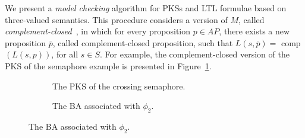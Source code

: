 %
%


We present a \emph{model checking} algorithm for PKSs and LTL formulae based on three-valued semantics. 
This procedure considers a version of $M$, called \emph{complement-closed}~\cite{bruns2000model}, in which for every proposition $p \in AP$, there exists a new proposition $\overline{p}$, called complement-closed proposition, such that $L(s,\overline{p})=$ comp$(L(s,p))$, for all $s \in S$.
For example, the complement-closed version of the PKS of the semaphore example is presented in Figure~\ref{fig:model}.

\begin{figure}[t]
\begin{minipage}[b]{.5\textwidth}
  \begin{figure}[H]
 \centering

\caption{The PKS of  the  crossing semaphore.}
\label{fig:model}
\end{figure}
\end{minipage}
\begin{minipage}[b]{.5\textwidth}
  \begin{figure}[H]
\centering

\caption{The BA associated with $\phi_2$.}
\label{fig:property}
\end{figure}
\end{minipage}
\end{figure}



